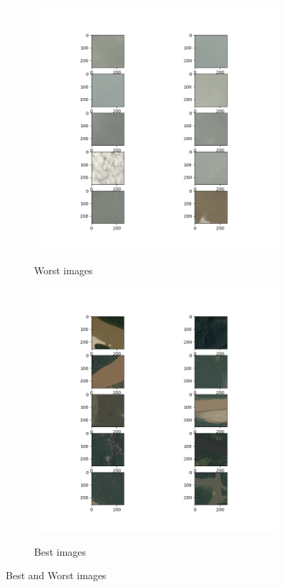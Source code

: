 \documentclass[12pt, letterpaper, twoside]{article}
\begin{document}
\begin{figure}
\centering
\begin{subfigure}{.5\textwidth}
  \centering
  \includegraphics[scale=0.5]{"10_worst.png"}\\
  \caption{Worst images}
  \label{fig:sub1}
\end{subfigure}%
\begin{subfigure}{.5\textwidth}
  \centering
  \includegraphics[scale=0.5]{"10_best.png"}\\
  \caption{Best images}
  \label{fig:sub2}
\end{subfigure}
\caption{Best and Worst images}
\label{fig:test}
\end{figure}
\end{document}

